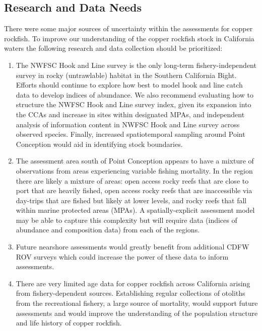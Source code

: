 \documentclass[11pt,
  english,
  letterpaper,
]{article}
\begin{document}
\hypertarget{research-and-data-needs-1}{%
\subsection{Research and Data Needs}\label{research-and-data-needs-1}}

There were some major sources of uncertainty within the assessments for copper rockfish. To improve our understanding of the copper rockfish stock in California waters the following research and data collection should be prioritized:

\begin{enumerate}

  \item  The NWFSC Hook and Line survey is the only long-term fishery-independent survey in rocky (untrawlable) habitat in the Southern California Bight. Efforts should continue to explore how best to model hook and line catch data to develop indices of abundance. We also recommend evaluating how to structure the NWFSC Hook and Line survey index, given its expansion into the CCAs and increase in sites within designated MPAs, and independent analysis of information content in NWFSC Hook and Line survey across observed species. Finally, increased spatiotemporal sampling around Point Conception would aid in identifying stock boundaries.

    \item The assessment area south of Point Conception appears to have a mixture of observations from areas experiencing variable fishing mortality. In the region there are likely a mixture of areas: open access rocky reefs that are close to port that are heavily fished, open access rocky reefs that are inaccessible via day-trips that are fished but likely at lower levels, and rocky reefs that fall within marine protected areas (MPAs). A spatially-explicit assessment model may be able to capture this complexity but will require data (indices of abundance and composition data) from each of the regions. 
    
    \item Future nearshore assessments would greatly benefit from additional CDFW ROV surveys which could increase the power of these data to inform assessments.

    \item There are very limited age data for copper rockfish across California arising from fishery-dependent sources. Establishing regular collections of otoliths from the recreational fishery, a large source of mortality, would support future assessments and would improve the understanding of the population structure and life history of copper rockfish. 


\end{enumerate}
\end{document}
